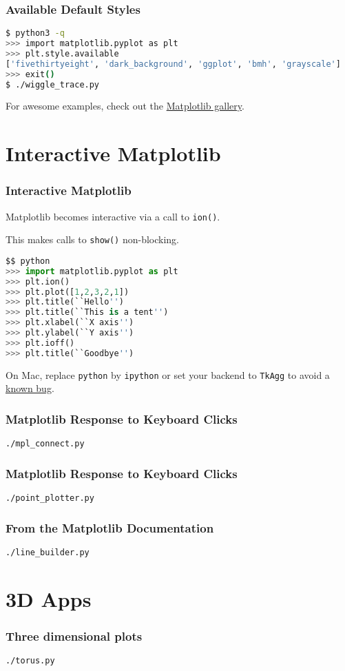 \documentclass{beamer}
\begin{document}
\begin{frame}[fragile]
\frametitle{Available Default Styles}

\begin{lstlisting}[language=bash]
$ python3 -q
>>> import matplotlib.pyplot as plt
>>> plt.style.available
['fivethirtyeight', 'dark_background', 'ggplot', 'bmh', 'grayscale']
>>> exit()
$ ./wiggle_trace.py
\end{lstlisting}
\end{frame}

\begin{frame}
For awesome examples, check out the \href{http://matplotlib.org/gallery.html}{Matplotlib gallery}.
\end{frame}

\section{Interactive Matplotlib}
\begin{frame}[fragile]
\frametitle{Interactive Matplotlib}

Matplotlib becomes interactive via a call to \texttt{ion()}.

This makes calls to \texttt{show()} non-blocking.
\begin{lstlisting}[language=Python]
$$ python
>>> import matplotlib.pyplot as plt
>>> plt.ion()
>>> plt.plot([1,2,3,2,1])
>>> plt.title(``Hello'')
>>> plt.title(``This is a tent'')
>>> plt.xlabel(``X axis'')
>>> plt.ylabel(``Y axis'')
>>> plt.ioff()
>>> plt.title(``Goodbye'')
\end{lstlisting}
On Mac, replace \texttt{python} by \texttt{ipython} or set your backend to \texttt{TkAgg} to avoid a \href{http://stackoverflow.com/questions/25960000/interactive-mode-doesnt-switch-on-from-script-matplotlib-1-4-0-python-2-7-5-on}{known bug}.
\end{frame}

\begin{frame}[fragile]
\frametitle{Matplotlib Response to Keyboard Clicks}
\texttt{./mpl\_connect.py}
\end{frame}

\begin{frame}[fragile]
\frametitle{Matplotlib Response to Keyboard Clicks}
\texttt{./point\_plotter.py}
\end{frame}

\begin{frame}[fragile]
\frametitle{From the Matplotlib Documentation}
\texttt{./line\_builder.py}
\end{frame}

\section{3D Apps}
\begin{frame}[fragile]
\frametitle{Three dimensional plots}
\texttt{./torus.py}
\end{frame}
\end{document}
